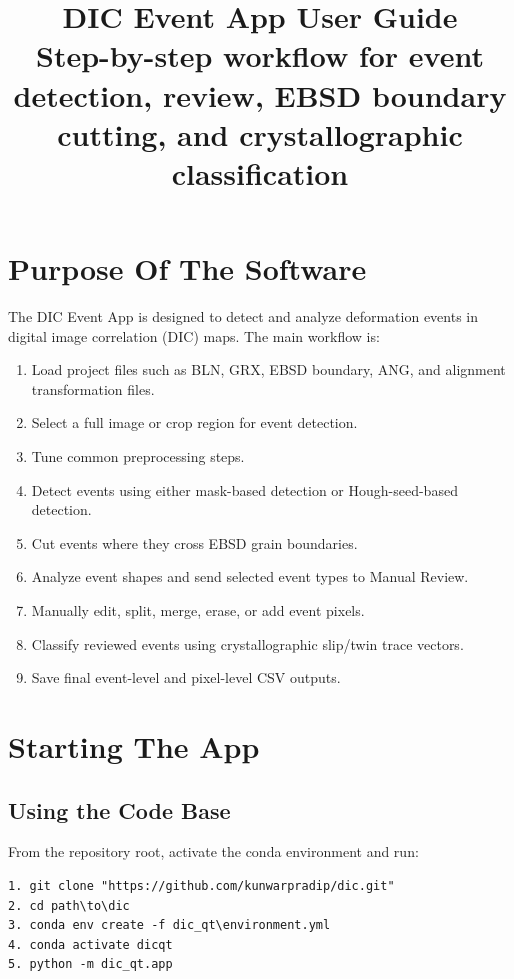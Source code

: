 \documentclass[11pt]{article}
\title{\textbf{DIC Event App User Guide}\\
\large Step-by-step workflow for event detection, review, EBSD boundary cutting, and crystallographic classification}
\author{}
\date{}
\begin{document}
\maketitle
\tableofcontents
\newpage

\section{Purpose Of The Software}

The DIC Event App is designed to detect and analyze deformation events in digital image correlation (DIC) maps. The main workflow is:

\begin{enumerate}
    \item Load project files such as BLN, GRX, EBSD boundary, ANG, and alignment transformation files.
    \item Select a full image or crop region for event detection.
    \item Tune common preprocessing steps.
    \item Detect events using either mask-based detection or Hough-seed-based detection.
    \item Cut events where they cross EBSD grain boundaries.
    \item Analyze event shapes and send selected event types to Manual Review.
    \item Manually edit, split, merge, erase, or add event pixels.
    \item Classify reviewed events using crystallographic slip/twin trace vectors.
    \item Save final event-level and pixel-level CSV outputs.
\end{enumerate}

\section{Starting The App}
\subsection{Using the Code Base}
From the repository root, activate the conda environment and run:

\begin{verbatim}
1. git clone "https://github.com/kunwarpradip/dic.git"
2. cd path\to\dic
3. conda env create -f dic_qt\environment.yml
4. conda activate dicqt
5. python -m dic_qt.app
\end{verbatim}
\end{document}
